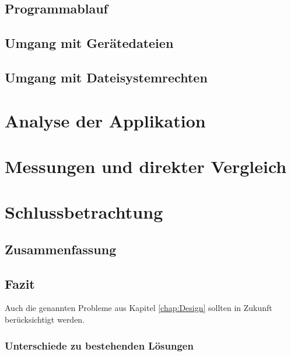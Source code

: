 \documentclass[
	10pt,			%
	a4paper,		%
	parskip=half,		%
	DIV=4,			%
	captions=nooneline,	%
	tablecaptionabove,	%
	bibliography=totoc,	%
	bibtotocnumbered,	%
	liststotocnumbered,	%
	headinclude,
	headsepline,		%
	1.6headlines,		%
	]
	{book}
\begin{document}
\section{Programmablauf}

\section{Umgang mit Gerätedateien}


\section{Umgang mit Dateisystemrechten}
	\label{sec:permissions}

\chapter{Analyse der Applikation}

\chapter{Messungen und direkter Vergleich}
\label{sec:android}


\chapter{Schlussbetrachtung}
\section{Zusammenfassung}

\section{Fazit}

Auch die genannten Probleme aus Kapitel \ref{chap:Design} sollten in Zukunft berücksichtigt werden.

\subsection{Unterschiede zu bestehenden Lösungen}
\end{document}
